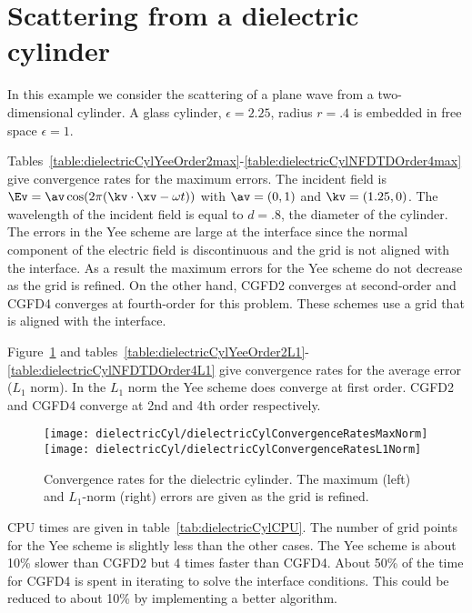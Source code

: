 \documentclass[11pt]{article}
\begin{document}



\clearpage
\section{Scattering from a dielectric cylinder}\label{sec:dielectricCylinder}

In this example we consider the scattering of a plane wave from a
two-dimensional cylinder. 
A glass cylinder, $\epsilon=2.25$, radius $r=.4$ is embedded in free space $\epsilon=1$. 


Tables~\ref{table:dielectricCylYeeOrder2max}-\ref{table:dielectricCylNFDTDOrder4max}
give convergence rates for the maximum errors. The incident field is $\Ev = \av \cos(2\pi(\kv\cdot\xv - \omega t) )$ with
$\av=( 0, 1)$ and $\kv=(1.25,0)$. The wavelength of the incident field is equal to $d=.8$, the diameter of the cylinder.
The errors in the Yee scheme are large at the interface since the normal component of the
electric field is discontinuous and the grid is not aligned with the interface.
As a result the maximum errors for the Yee scheme do not decrease as the grid is refined. 
On the other hand, CGFD2 converges at second-order
and CGFD4 converges at fourth-order for this problem. These schemes use a grid that is aligned with the interface.

Figure~\ref{fig:dielectricCylConvergenceRatesMaxNorm} and tables~\ref{table:dielectricCylYeeOrder2L1}-\ref{table:dielectricCylNFDTDOrder4L1} 
give convergence rates for the average error ($L_1$ norm).
In the $L_1$ norm the Yee scheme does converge at first order. CGFD2 and CGFD4 converge
at 2nd and 4th order respectively.

\begin{figure}[hbt]
\begin{center}\small
\texttt{[image: dielectricCyl/dielectricCylConvergenceRatesMaxNorm]}
\texttt{[image: dielectricCyl/dielectricCylConvergenceRatesL1Norm]}
%
\caption{Convergence rates for the dielectric cylinder.  
  The maximum (left) and $L_1$-norm (right) errors are given as the grid is refined.}
\label{fig:dielectricCylConvergenceRatesMaxNorm}
\end{center}
\end{figure}

CPU times are given in table~\ref{tab:dielectricCylCPU}. The number of grid points for the 
Yee scheme is slightly less than the other cases. The Yee scheme is about 10\% slower than
CGFD2 but 4 times faster than CGFD4. About 50\% of the time for CGFD4 is spent in iterating
to solve the interface conditions. This could be reduced to about 10\% by implementing a better algorithm.
\end{document}
